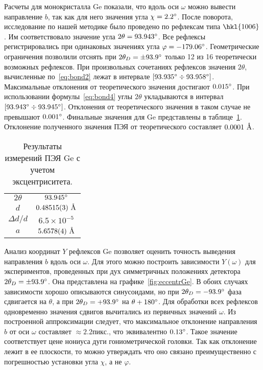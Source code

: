 Расчеты для монокристалла Ge показали, что вдоль оси $\omega$ можно вывести направление $b$, так как для него значения угла $\chi = 2.2^\circ$.
После поворота, исследование по нашей методике было проведено по рефлексам типа $\hkl{10 0 6}$.
Им соответствовало значение угла $2\theta = 93.943^\circ$.
Все рефлексы регистрировались при одинаковых значениях угла $\varphi = -179.06^\circ$.
Геометрические ограничения позволили отснять при $2\theta_D = \pm 93.9^\circ$ только 12 из 16 теоретически возможных рефлексов.
При произвольных сочетаниях рефлексов значения $2\theta$, вычисленные по~\ref{eq:bond2} лежат в интервале $[93.935^\circ\div93.958^\circ]$.
Максимальные отклонения от теоретического значения достигают $0.015^\circ$.
При использовании формулы~\ref{eq:bond4} углы $2\theta$ укладываются в интервал $[93.943^\circ\div93.945^\circ]$.
Отклонения от теоретического значения в таком случае не превышают $0.001^\circ$.
Финальные значения для Ge представлены в таблице~\ref{tab:Ge:eccentr}.
Отклонение полученного значения ПЭЯ от теоретического составляет $0.0001\ \text{\AA}$.
\begin{table}[ht!]
    \centering
    \begin{tabular}{ |c|c| }
        \hline
        $2\theta$ & $93.945^\circ$ \\
        $d$ & $0.48515 (3)\ \text{\AA}$ \\
        $\Delta d / d$ & $6.5 \times 10^{-5}$ \\
        $a$ & $5.6578 (4)\ \text{\AA}$ \\
        \hline
    \end{tabular}
    \caption{Результаты измерений ПЭЯ Ge с учетом эксцентриситета.}
    \label{tab:Ge:eccentr}
\end{table}

Анализ координат $Y$ рефлексов Ge позволяет оценить точность выведения направления $b$ вдоль оси $\omega$.
Для этого можно построить зависимости $Y(\omega)$ для экспериментов, проведенных при дух симметричных положениях детектора $2\theta_D = \pm 93.9^\circ$.
Она представлена на графике~\ref{fig:eccentrGe}.
В обоих случаях зависимости хорошо описываются синусоидами, но при $2\theta_D = -93.9^\circ$ фаза сдвигается на $\theta$, а при $2\theta_D = +93.9^\circ$ на $\theta + 180^\circ$.
Для обработки всех рефлексов одновременно значения сдвигов вычитались из первичных значений $\omega$.
Из построенной аппроксимации следует, что максимальное отклонение направления $b$ от оси $\omega$ составляет $\approx 2.2\unit{пикс.}$, что эквивалентно $0.13^\circ$.
Такое значение соответствует цене нониуса дуги гониометрической головки.
Так как отклонение лежит в ее плоскости, то можно утверждать что оно связано преимущественно с погрешностью установки угла $\chi$, а не $\varphi$.

